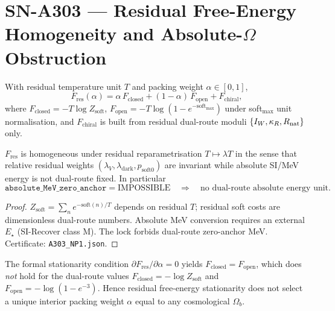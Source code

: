 \section{SN-A303 --- Residual Free-Energy Homogeneity and Absolute-$\Omega$ Obstruction}
\label{sec:SN-A303}

\begin{definition}
\label{def:A303-F}
With residual temperature unit $T$ and packing weight $\alpha\in[0,1]$,
\begin{equation}
\label{eq:A303-F}
F_{\mathrm{res}}(\alpha)
=
\alpha\, F_{\mathrm{closed}}
+
(1-\alpha)\, F_{\mathrm{open}}
+
F_{\mathrm{chiral}},
\end{equation}
where
$F_{\mathrm{closed}}=-T\log Z_{\mathrm{soft}}$,
$F_{\mathrm{open}}=-T\log(1-e^{-\mathrm{soft}_{\max}})$ under soft$_{\max}$ unit normalisation,
and $F_{\mathrm{chiral}}$ is built from residual dual-route moduli $\{I_W,\kappa_R,R_{\rm nat}\}$ only.
\end{definition}

\begin{theorem}
\label{thm:A303-scale}
$F_{\mathrm{res}}$ is homogeneous under residual reparametrisation $T\mapsto\lambda T$ in the sense that
relative residual weights $(\lambda_V,\lambda_{\mathrm{dark}},p_{\mathrm{soft0}})$ are invariant while
absolute SI/MeV energy is not dual-route fixed. In particular
\begin{equation}
\texttt{absolute\_MeV\_zero\_anchor}=\mathrm{IMPOSSIBLE}
\quad\Longrightarrow\quad
\text{no dual-route absolute energy unit.}
\end{equation}
\end{theorem}

\begin{proof}
$Z_{\mathrm{soft}}=\sum_n e^{-\mathrm{soft}(n)/T}$ depends on residual $T$; residual soft costs are dimensionless dual-route numbers. Absolute MeV conversion requires an external $E_\star$ (SI-Recover class M). The lock forbids dual-route zero-anchor MeV. Certificate: \texttt{A303\_NP1.json}.
\end{proof}

\begin{theorem}
\label{thm:A303-alpha}
The formal stationarity condition $\partial F_{\mathrm{res}}/\partial\alpha=0$ yields
$F_{\mathrm{closed}}=F_{\mathrm{open}}$, which does \emph{not} hold for the dual-route values
$F_{\mathrm{closed}}=-\log Z_{\mathrm{soft}}$ and $F_{\mathrm{open}}=-\log(1-e^{-3})$.
Hence residual free-energy stationarity does not select a unique interior packing weight
$\alpha$ equal to any cosmological $\Omega_b$.
\end{theorem}

